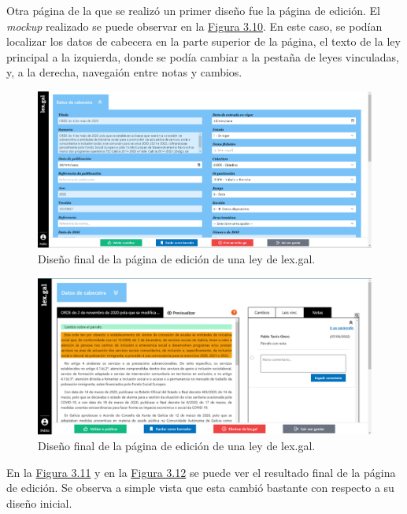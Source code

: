 Otra página de la que se realizó un primer diseño fue la página de edición. El {\it mockup} realizado se puede observar en la \hyperref[enlaceMockupEdicionDiseno]{Figura 3.10}. En este caso, se podían localizar los datos de cabecera en la parte superior de la página, el texto de la ley principal a la izquierda, donde se podía cambiar a la pestaña de leyes vinculadas, y, a la derecha, navegaión entre notas y cambios.

\begin{figure}[H]
\centerline{\includegraphics[width=15cm]{figuras/manualUsuario/EditarCabecera.PNG}}
\caption{Diseño final de la página de edición de una ley de lex.gal.}
\label{enlaceCabeceraDiseno}
\end{figure}

\begin{figure}[H]
\centerline{\includegraphics[width=15cm]{figuras/manualUsuario/PestanaNotas.PNG}}
\caption{Diseño final de la página de edición de una ley de lex.gal.}
\label{enlaceEdicionLexGalDiseno}
\end{figure}

En la \hyperref[enlaceCabeceraDiseno]{Figura 3.11} y en la \hyperref[enlaceEdicionLexGalDiseno]{Figura 3.12} se puede ver el resultado final de la página de edición. Se observa a simple vista que esta cambió bastante con respecto a su diseño inicial.
\\

